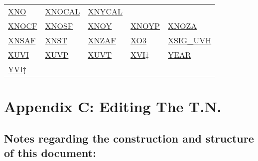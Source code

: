 \documentclass[
  english,
]{book}
\begin{document}
\begin{longtable}[]{@{}lllll@{}}
\href{./air-chemistry-measurements.html\#no-noy}{XNO} &
\href{./air-chemistry-measurements.html\#mr-no-no2}{XNOCAL} &
\href{./air-chemistry-measurements.html\#mr-no-no2}{XNYCAL} \\
\href{./air-chemistry-measurements.html\#no-noy}{XNOCF} &
\href{./air-chemistry-measurements.html\#no-noy}{XNOSF} &
\href{./air-chemistry-measurements.html\#no-noy}{XNOY} &
\href{./air-chemistry-measurements.html\#no-noy}{XNOYP} &
\href{./air-chemistry-measurements.html\#no-noy}{XNOZA} \\
\href{./air-chemistry-measurements.html\#no-noy}{XNSAF} &
\href{./air-chemistry-measurements.html\#no-noy}{XNST} &
\href{./air-chemistry-measurements.html\#no-noy}{XNZAF} &
\href{./air-chemistry-measurements.html\#f03-acd}{XO3} &
\href{./the-state-of-the-atmosphere.html\#uvh-voltage}{XSIG\_UVH} \\
\href{./obsolete-variables.html\#xuvi}{XUVI} &
\href{./obsolete-variables.html\#xuvi}{XUVP} &
\href{./obsolete-variables.html\#xuvi}{XUVT} &
\href{./obsolete-variables.html\#ltn51}{XVI\(\ddagger\)} &
\href{./general-information-about-data-files.html\#mdy}{YEAR} \\
\href{./obsolete-variables.html\#ltn51}{YVI\(\ddagger\)} & & & & \\
\bottomrule
\end{longtable}

\hypertarget{appendix-c-editing-the-t.n.}{%
\chapter*{Appendix C: Editing The
T.N.}\label{appendix-c-editing-the-t.n.}}

\hypertarget{notes-regarding-the-construction-and-structure-of-this-document}{%
\section*{Notes regarding the construction and structure of this
document:}\label{notes-regarding-the-construction-and-structure-of-this-document}}
\end{document}
